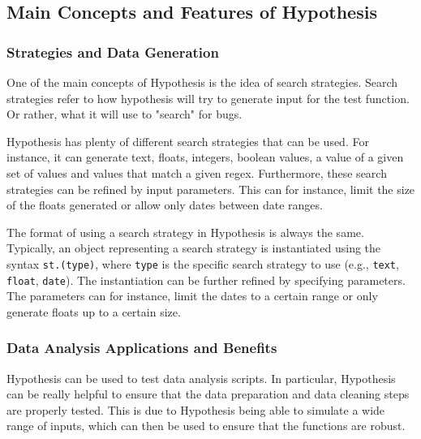 \documentclass[runningheads]{llncs}
\begin{document}
\subsection{Main Concepts and Features of Hypothesis}
\subsubsection{Strategies and Data Generation}
One of the main concepts of Hypothesis is the idea of search strategies. Search strategies refer to how hypothesis will
try to generate input for the test function. Or rather, what it will use to "search" for bugs.

Hypothesis has plenty of different search strategies that can be used. For instance, it can generate text, floats, integers, boolean values, a value of a given set of values and values that match a given regex.
Furthermore, these search strategies can be refined by input parameters. This can for instance, limit the size of the floats generated or allow only dates between date ranges.

The format of using a search strategy in Hypothesis is always the same. Typically, an object representing a search strategy is instantiated using the syntax \texttt{st.(type)}, where \texttt{type} is the specific search strategy to use (e.g., \texttt{text}, \texttt{float}, \texttt{date}). The instantiation can be further refined by specifying parameters. The parameters can for instance, limit the dates to a certain range or only generate floats up to a certain size.




\subsubsection{Data Analysis Applications and Benefits}
Hypothesis can be used to test data analysis scripts. In particular, Hypothesis can be really helpful to ensure that
the data preparation and data cleaning steps are properly tested. This is due to Hypothesis being able to simulate
a wide range of inputs, which can then be used to ensure that the functions are robust.
\end{document}
